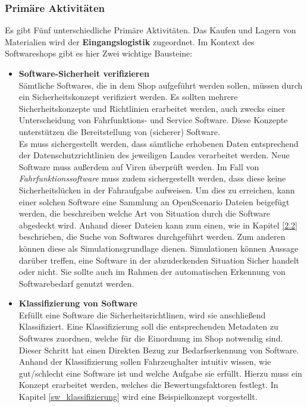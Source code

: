\subsubsection{Primäre Aktivitäten}
Es gibt Fünf unterschiedliche Primäre Aktivitäten. Das Kaufen und Lagern von Materialien wird der \textbf{Eingangslogistik }zugeordnet. Im Kontext des Softwareshops gibt es hier Zwei wichtige Bausteine:
\begin{itemize}
	\item[] \hspace{-0.6cm}\textbf{Software-Sicherheit verifizieren}\\
	Sämtliche Softwares, die in dem Shop aufgeführt werden sollen, müssen durch ein Sicherheitskonzept verifiziert werden. Es sollten mehrere Sicherheitskonzepte und Richtlinien erarbeitet werden, auch zwecks einer Unterscheidung von Fahrfunktions- und Service Software. Diese Konzepte unterstützen die Bereitstellung von (sicherer) Software.\\
	Es muss sichergestellt werden, dass sämtliche erhobenen Daten entsprechend der Datenschutzrichtlinien des jeweiligen Landes verarbeitet werden. Neue Software muss außerdem auf Viren überprüft werden. Im Fall von \textit{Fahrfunktionssoftware }muss zudem sichergestellt werden, dass diese keine Sicherheitslücken in der Fahraufgabe aufweisen. Um dies zu erreichen, kann einer solchen Software eine Sammlung an OpenScenario Dateien beigefügt werden, die beschreiben welche Art von Situation durch die Software abgedeckt wird. Anhand dieser Dateien kann zum einen, wie in Kapitel \ref{2.2} beschrieben, die Suche von Softwares durchgeführt werden. Zum anderen können diese als Simulationsgrundlage dienen. Simulationen können Aussage darüber treffen, eine Software in der abzudeckenden Situation Sicher handelt oder nicht. Sie sollte auch im Rahmen der automatischen Erkennung von Softwarebedarf genutzt werden.
	
	\item[] \hspace{-0.6cm} \textbf{Klassifizierung von Software}\\
	Erfüllt eine Software die Sicherheitsrichtlinen, wird sie anschließend Klassifiziert. Eine Klassifizierung soll die entsprechenden Metadaten zu Softwares zuordnen, welche für die Einordnung im Shop notwendig sind. Dieser Schritt hat einen Direkten Bezug zur Bedarfserkennung von Software. Anhand der Klassifizierung sollen Fahrzeughalter intuitiv wissen, wie gut/schlecht eine Software ist und welche Aufgabe sie erfüllt. Hierzu muss ein Konzept erarbeitet werden, welches die Bewertungsfaktoren festlegt. In Kapitel \ref{sw_klassifizierung} wird eine Beispielkonzept vorgestellt.
\end{itemize}
